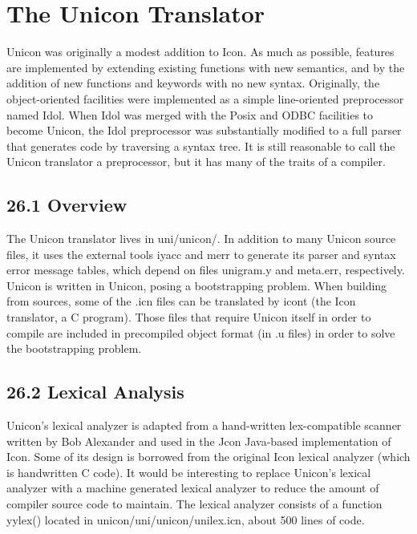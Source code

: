 \chapter{The Unicon Translator}

Unicon was originally a modest addition to Icon. As much as possible,
features are implemented by extending existing functions with new
semantics, and by the addition of new functions and keywords with no
new syntax. Originally, the object-oriented facilities were
implemented as a simple line-oriented preprocessor named Idol.  When
Idol was merged with the Posix and ODBC facilities to become Unicon,
the Idol preprocessor was substantially modified to a full parser that
generates code by traversing a syntax tree. It is still reasonable to
call the Unicon translator a preprocessor, but it has many of the
traits of a compiler.


\section[26.1 Overview]{26.1 Overview}

The Unicon translator lives in uni/unicon/. In addition to many Unicon
source files, it uses the external tools iyacc and merr to generate
its parser and syntax error message tables, which depend on files
unigram.y and meta.err, respectively. Unicon is written in Unicon,
posing a bootstrapping problem. When building from sources, some of
the .icn files can be translated by icont (the Icon translator, a C
program). Those files that require Unicon itself in order to compile
are included in precompiled object format (in .u files) in order to
solve the bootstrapping problem.

\section[26.2 Lexical Analysis]{26.2 Lexical Analysis}

Unicon's lexical analyzer is adapted from a hand-written lex-compatible
scanner written by Bob Alexander and used in the Jcon Java-based
implementation of Icon. Some of its design is borrowed from the
original Icon lexical analyzer (which is handwritten C code). It would
be interesting to replace Unicon's lexical analyzer with a machine
generated lexical analyzer to reduce the amount of compiler source
code to maintain. The lexical analyzer consists of a function
yylex() located in unicon/uni/unicon/unilex.icn, about 500 lines of
code.

